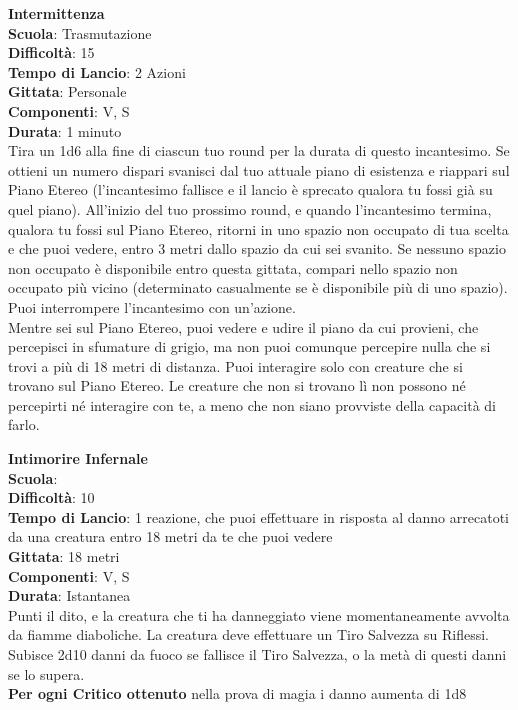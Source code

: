 \begin{multicols}{2}
\medskip\textbf{Intermittenza}\\
\textbf{Scuola}: Trasmutazione\\
\textbf{Difficoltà}: 15\\
\textbf{Tempo di Lancio}: 2 Azioni\\
\textbf{Gittata}: Personale\\
\textbf{Componenti}: V, S\\
\textbf{Durata}: 1 minuto\\
Tira un 1d6 alla fine di ciascun tuo round per la durata di questo incantesimo. Se ottieni un numero dispari svanisci dal tuo attuale piano di esistenza e riappari sul Piano Etereo (l'incantesimo fallisce e il lancio è sprecato qualora tu fossi già su quel piano). All'inizio del tuo prossimo round, e quando l'incantesimo termina, qualora tu fossi sul Piano Etereo, ritorni in uno spazio non occupato di tua scelta e che puoi vedere, entro 3 metri dallo spazio da cui sei svanito. Se nessuno spazio non occupato è disponibile entro questa gittata, compari nello spazio non occupato più vicino (determinato casualmente se è disponibile più di uno spazio). Puoi interrompere l'incantesimo con un'azione.\\
Mentre sei sul Piano Etereo, puoi vedere e udire il piano da cui provieni, che percepisci in sfumature di grigio, ma non puoi comunque percepire nulla che si trovi a più di 18 metri di distanza. Puoi interagire solo con creature che si trovano sul Piano Etereo. Le creature che non si trovano lì non possono né percepirti né interagire con te, a meno che non siano provviste della capacità di farlo.

\medskip\textbf{Intimorire Infernale}\\
\textbf{Scuola}: \\
\textbf{Difficoltà}: 10\\
\textbf{Tempo di Lancio}: 1 reazione, che puoi effettuare in risposta al danno arrecatoti da una creatura entro 18 metri da te che puoi vedere\\
\textbf{Gittata}: 18 metri\\
\textbf{Componenti}: V, S\\
\textbf{Durata}: Istantanea\\
Punti il dito, e la creatura che ti ha danneggiato viene momentaneamente avvolta da fiamme diaboliche. La creatura deve effettuare un Tiro Salvezza su Riflessi. Subisce 2d10 danni da fuoco se fallisce il Tiro Salvezza, o la metà di questi danni se lo supera.\\
\textbf{Per ogni Critico ottenuto} nella prova di magia i danno aumenta di 1d8


\end{multicols}
